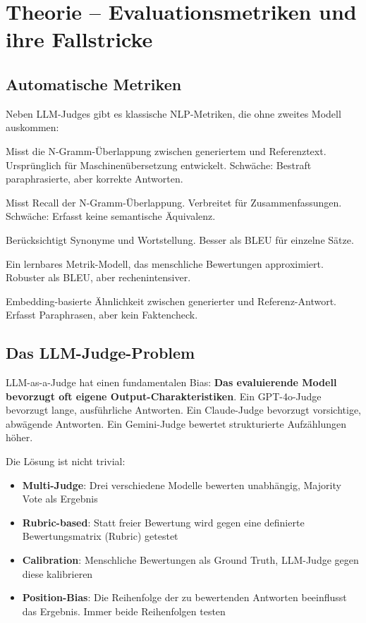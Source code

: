 \section{Theorie -- Evaluationsmetriken und ihre Fallstricke}

\subsection{Automatische Metriken}

Neben LLM-Judges gibt es klassische NLP-Metriken, die ohne zweites Modell auskommen:

\begin{description}[leftmargin=*,style=nextline]
    \item[BLEU (Bilingual Evaluation Understudy)] Misst die N-Gramm-Überlappung zwischen generiertem und Referenztext. Ursprünglich für Maschinenübersetzung entwickelt. Schwäche: Bestraft paraphrasierte, aber korrekte Antworten.
    \item[ROUGE (Recall-Oriented Understudy for Gisting Evaluation)] Misst Recall der N-Gramm-Überlappung. Verbreitet für Zusammenfassungen. Schwäche: Erfasst keine semantische Äquivalenz.
    \item[METEOR] Berücksichtigt Synonyme und Wortstellung. Besser als BLEU für einzelne Sätze.
    \item[BLEURT] Ein lernbares Metrik-Modell, das menschliche Bewertungen approximiert. Robuster als BLEU, aber rechenintensiver.
    \item[SEMANTIC SIMILARITY] Embedding-basierte Ähnlichkeit zwischen generierter und Referenz-Antwort. Erfasst Paraphrasen, aber kein Faktencheck.
\end{description}

\subsection{Das LLM-Judge-Problem}

LLM-as-a-Judge hat einen fundamentalen Bias: \textbf{Das evaluierende Modell bevorzugt oft eigene Output-Charakteristiken}. Ein GPT-4o-Judge bevorzugt lange, ausführliche Antworten. Ein Claude-Judge bevorzugt vorsichtige, abwägende Antworten. Ein Gemini-Judge bewertet strukturierte Aufzählungen höher.

Die Lösung ist nicht trivial:
\begin{itemize}[leftmargin=*]
    \item \textbf{Multi-Judge}: Drei verschiedene Modelle bewerten unabhängig, Majority Vote als Ergebnis
    \item \textbf{Rubric-based}: Statt freier Bewertung wird gegen eine definierte Bewertungsmatrix (Rubric) getestet
    \item \textbf{Calibration}: Menschliche Bewertungen als Ground Truth, LLM-Judge gegen diese kalibrieren
    \item \textbf{Position-Bias}: Die Reihenfolge der zu bewertenden Antworten beeinflusst das Ergebnis. Immer beide Reihenfolgen testen
\end{itemize}

